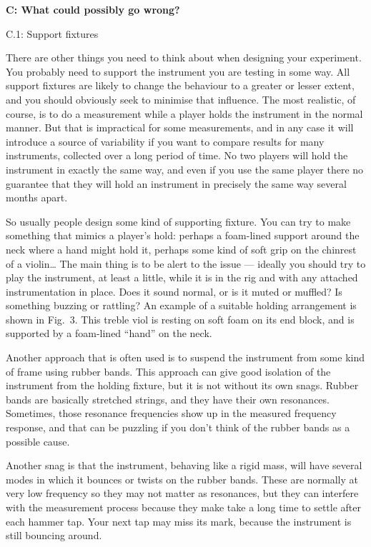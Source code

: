   \textbf{C: What could possibly go wrong?} 

  C.1: Support fixtures 

  There are other things you need to think about when designing your 
  experiment. You probably need to support the instrument you are testing in 
  some way. All support fixtures are likely to change the behaviour to a 
  greater or lesser extent, and you should obviously seek to minimise that 
  influence. The most realistic, of course, is to do a measurement while a 
  player holds the instrument in the normal manner. But that is impractical for 
  some measurements, and in any case it will introduce a source of variability 
  if you want to compare results for many instruments, collected over a long 
  period of time. No two players will hold the instrument in exactly the same 
  way, and even if you use the same player there no guarantee that they will 
  hold an instrument in precisely the same way several months apart. 

  So usually people design some kind of supporting fixture. You can try to make 
  something that mimics a player’s hold: perhaps a foam-lined support around 
  the neck where a hand might hold it, perhaps some kind of soft grip on the 
  chinrest of a violin… The main thing is to be alert to the issue — ideally 
  you should try to play the instrument, at least a little, while it is in the 
  rig and with any attached instrumentation in place. Does it sound normal, or 
  is it muted or muffled? Is something buzzing or rattling? An example of a 
  suitable holding arrangement is shown in Fig.\ 3. This treble viol is resting 
  on soft foam on its end block, and is supported by a foam-lined ``hand'' on 
  the neck. 


  Another approach that is often used is to suspend the instrument from some 
  kind of frame using rubber bands. This approach can give good isolation of 
  the instrument from the holding fixture, but it is not without its own snags. 
  Rubber bands are basically stretched strings, and they have their own 
  resonances. Sometimes, those resonance frequencies show up in the measured 
  frequency response, and that can be puzzling if you don't think of the rubber 
  bands as a possible cause. 

  Another snag is that the instrument, behaving like a rigid mass, will have 
  several modes in which it bounces or twists on the rubber bands. These are 
  normally at very low frequency so they may not matter as resonances, but they 
  can interfere with the measurement process because they make take a long time 
  to settle after each hammer tap. Your next tap may miss its mark, because the 
  instrument is still bouncing around. 

